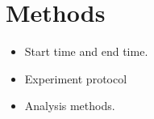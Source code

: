 \chapter{Methods}

\begin{itemize}
    \item Start time and end time.
    \item Experiment protocol
    \item Analysis methods.
\end{itemize}